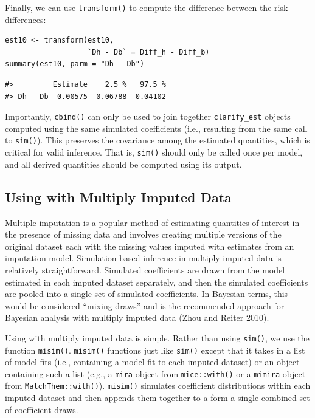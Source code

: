 Finally, we can use \texttt{transform()} to compute the difference between the risk differences:

\begin{verbatim}
est10 <- transform(est10,
                   `Dh - Db` = Diff_h - Diff_b)
summary(est10, parm = "Dh - Db")
\end{verbatim}

\begin{verbatim}
#>         Estimate    2.5 %   97.5 %
#> Dh - Db -0.00575 -0.06788  0.04102
\end{verbatim}

Importantly, \texttt{cbind()} can only be used to join together \texttt{clarify\_est} objects computed using the same simulated coefficients (i.e., resulting from the same call to \texttt{sim()}). This preserves the covariance among the estimated quantities, which is critical for valid inference. That is, \texttt{sim()} should only be called once per model, and all derived quantities should be computed using its output.

\hypertarget{using-with-multiply-imputed-data}{%
\subsection{\texorpdfstring{Using  with Multiply Imputed Data}{Using  with Multiply Imputed Data}}\label{using-with-multiply-imputed-data}}

Multiple imputation is a popular method of estimating quantities of interest in the presence of missing data and involves creating multiple versions of the original dataset each with the missing values imputed with estimates from an imputation model. Simulation-based inference in multiply imputed data is relatively straightforward. Simulated coefficients are drawn from the model estimated in each imputed dataset separately, and then the simulated coefficients are pooled into a single set of simulated coefficients. In Bayesian terms, this would be considered ``mixing draws'' and is the recommended approach for Bayesian analysis with multiply imputed data (Zhou and Reiter 2010).

Using  with multiply imputed data is simple. Rather than using \texttt{sim()}, we use the function \texttt{misim()}. \texttt{misim()} functions just like \texttt{sim()} except that it takes in a list of model fits (i.e., containing a model fit to each imputed dataset) or an object containing such a list (e.g., a \texttt{mira} object from \texttt{mice::with()} or a \texttt{mimira} object from \texttt{MatchThem::with()}). \texttt{misim()} simulates coefficient distributions within each imputed dataset and then appends them together to a form a single combined set of coefficient draws.

